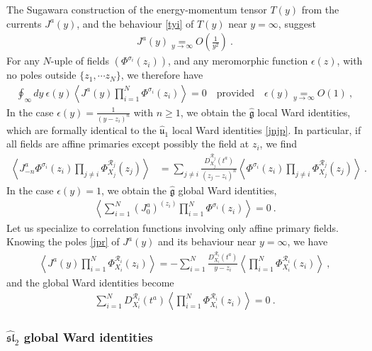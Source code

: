 \documentclass[12pt, a4paper, notitlepage, twoside]{report}
\numberwithin{equation}{section}
\theoremstyle{break}
\begin{document}
The Sugawara construction of the energy-momentum tensor $T(y)$ from the currents $J^a(y)$, and the behaviour \eqref{tyi} of $T(y)$ near $y=\infty$, suggest
\begin{align}
 \boxed{J^a(y) \underset{y\to \infty}{=} O\left(\frac{1}{y^2}\right)}\ .
\label{jayi}
\end{align}
For any $N$-uple of fields $(\Phi^{\sigma_i}(z_i))$, and any meromorphic function $\epsilon(z)$, with no poles outside $\{z_1,\cdots z_N\}$, we therefore have 
\begin{align}
 \oint_\infty dy\ \epsilon(y) \left\langle J^a(y)  \prod_{i=1}^N \Phi^{\sigma_i}(z_i)\right\rangle = 0 \quad \text{provided} \quad \epsilon(y) \underset{y\to\infty}{=} O(1)\ ,
\end{align}
In the case $\epsilon(y)=\frac{1}{(y-z_i)^n}$ with $n\geq 1$, we obtain the $\hat{\mathfrak{g}}$ local Ward identities, which are formally identical to the $\hat{\mathfrak{u}}_1$ local Ward identities \eqref{jnjp}. 
In particular, if all fields are affine primaries except possibly the field at $z_i$, we find 
\begin{align}
\left\langle J^a_{-n}\Phi^{\sigma_i}(z_i)\prod_{j\neq i} \Phi^{\mathcal{R}_j}_{X_j}(z_j)\right\rangle &=\sum_{j\neq i} \frac{D_{X_j}^{\mathcal{R}_j}(t^a)}{(z_j-z_i)^n} \left\langle \Phi^{\sigma_i}(z_i)\prod_{j\neq i} \Phi^{\mathcal{R}_j}_{X_j}(z_j)\right\rangle\ . 
\label{jmnz}
\end{align}
In the case $\epsilon(y)=1$, we obtain the $\hat{\mathfrak{g}}$ global Ward identities,
\begin{align}
 \left\langle \sum_{i=1}^N (J_0^a)^{(z_i)} \prod_{i=1}^N \Phi^{\sigma_i}(z_i)\right\rangle=0\ .
\end{align}
Let us specialize to correlation functions involving only affine primary fields.
Knowing the poles \eqref{jpr} of $J^a(y)$ and its behaviour near $y=\infty$, we have
\begin{align}
 \left\langle J^a(y) \prod_{i=1}^N \Phi^{\mathcal{R}_i}_{X_i}(z_i)\right\rangle = - \sum_{i=1}^N \frac{D^{\mathcal{R}_i}_{X_i}(t^a)}{y-z_i}\left\langle \prod_{i=1}^N \Phi^{\mathcal{R}_i}_{X_i}(z_i)\right\rangle\ ,
\label{dja}
\end{align}
and the global Ward identities become
\begin{align}
 \sum_{i=1}^N D_{X_i}^{\mathcal{R}_i}(t^a) \left\langle \prod_{i=1}^N \Phi^{\mathcal{R}_i}_{X_i}(z_i)\right\rangle   = 0 \ .
\label{drxt}
\end{align}

\subsubsection{$\widehat{\mathfrak{sl}}_2$ global Ward identities}
\end{document}
